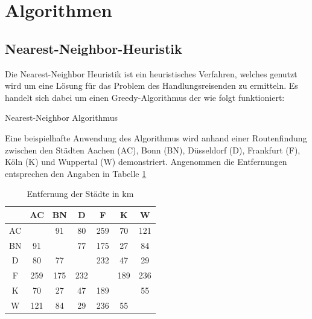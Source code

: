 \documentclass{article}
\begin{document}
%
%
%
\section{Algorithmen}

\subsection{Nearest-Neighbor-Heuristik}

Die Nearest-Neighbor Heuristik ist ein heuristisches Verfahren, welches genutzt wird um eine Lösung für das Problem des Handlungsreisenden zu ermitteln. Es handelt sich dabei um einen Greedy-Algorithmus der wie folgt funktioniert:

\begin{algorithm}
\caption{Nearest-Neighbor Algorithmus}
\end{algorithm}

Eine beispielhafte Anwendung des Algorithmus wird anhand einer Routenfindung zwischen den Städten Aachen (AC), Bonn (BN), Düsseldorf (D), Frankfurt (F), Köln (K) und Wuppertal (W) demonstriert. Angenommen die Entfernungen entsprechen den Angaben in Tabelle \ref{tbl:opt-struktur-select-reduktion}

\begin{table}
\centering
\begin{tabular}{ |c|c|c|c|c|c|c| }
\hline
 & AC & BN & D& F & K & W \\ 
\hline
AC &  & 91 & 80 & 259 & 70 & 121 \\ 
\hline
BN & 91 &  & 77 & 175 & 27 & 84 \\ 
\hline
D & 80 & 77 &  & 232 & 47 & 29 \\ 
\hline
F & 259 & 175 & 232 &  & 189 & 236 \\ 
\hline
K & 70 & 27 & 47 & 189 &  & 55 \\ 
\hline
W & 121 & 84 & 29 & 236 & 55 &  \\ 
\hline
\end{tabular}
\caption{Entfernung der Städte in km}
\label{tbl:opt-struktur-select-reduktion}
\end{table}
\end{document}
